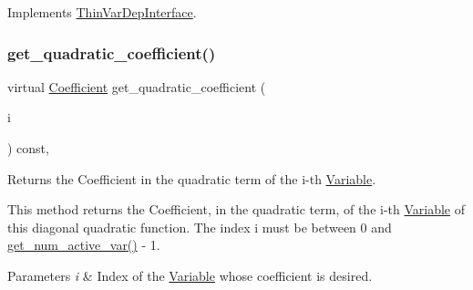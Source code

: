 Implements \mbox{\hyperlink{group___thin_var_dep_interface___c_l_a_s_s_e_s_ga6dbf09c17736b358d11f617e15856981}{Thin\+Var\+Dep\+Interface}}.

\mbox{\label{class_s_m_spp__di__unipi__it_1_1_d_quad_function_a3d6a5a28eab862ab685773c02d8b87e3}} 
\subsubsection{\texorpdfstring{get\+\_\+quadratic\+\_\+coefficient()}{get\_quadratic\_coefficient()}}
{\footnotesize\ttfamily virtual \mbox{\hyperlink{class_s_m_spp__di__unipi__it_1_1_d_quad_function_a1fa0f848dbb8d52dc62a1adfee1a1f90}{Coefficient}} get\+\_\+quadratic\+\_\+coefficient (\begin{DoxyParamCaption}\item[{const int}]{i }\end{DoxyParamCaption}) const\hspace{0.3cm}{\ttfamily [inline]}, {\ttfamily [virtual]}}



Returns the Coefficient in the quadratic term of the i-\/th \mbox{\hyperlink{class_s_m_spp__di__unipi__it_1_1_variable}{Variable}}. 

This method returns the Coefficient, in the quadratic term, of the i-\/th \mbox{\hyperlink{class_s_m_spp__di__unipi__it_1_1_variable}{Variable}} of this diagonal quadratic function. The index i must be between 0 and \mbox{\hyperlink{class_s_m_spp__di__unipi__it_1_1_d_quad_function_af7f92d9890df5e47c25215b99f97caef}{get\+\_\+num\+\_\+active\+\_\+var()}} -\/ 1.


\begin{DoxyParams}{Parameters}
{\em i} & Index of the \mbox{\hyperlink{class_s_m_spp__di__unipi__it_1_1_variable}{Variable}} whose coefficient is desired. \\
\hline
\end{DoxyParams}
\mbox{\label{class_s_m_spp__di__unipi__it_1_1_d_quad_function_ae2ab9abc3617f25a7c526c457362864f}} 
